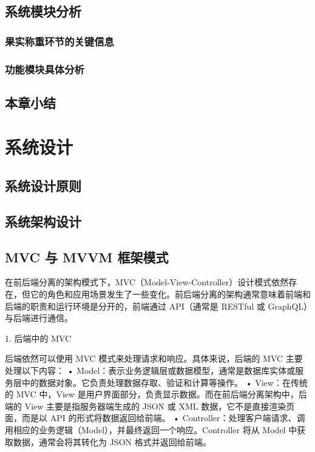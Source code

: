 \documentclass{xduugthesis}
\begin{document}
\section{系统模块分析}
\subsection{果实称重环节的关键信息}
\subsection{功能模块具体分析}

\section{本章小结}


\chapter{系统设计}

\section{系统设计原则}

\section{系统架构设计}

\section{MVC 与 MVVM 框架模式}
在前后端分离的架构模式下，MVC（Model-View-Controller）设计模式依然存在，但它的角色和应用场景发生了一些变化。前后端分离的架构通常意味着前端和后端的职责和运行环境是分开的，前端通过 API（通常是 RESTful 或 GraphQL）与后端进行通信。

1. 后端中的 MVC

后端依然可以使用 MVC 模式来处理请求和响应。具体来说，后端的 MVC 主要处理以下内容：
	•	Model：表示业务逻辑层或数据模型，通常是数据库实体或服务层中的数据对象。它负责处理数据存取、验证和计算等操作。
	•	View：在传统的 MVC 中，View 是用户界面部分，负责显示数据。而在前后端分离架构中，后端的 View 主要是指服务器端生成的 JSON 或 XML 数据，它不是直接渲染页面，而是以 API 的形式将数据返回给前端。
	•	Controller：处理客户端请求、调用相应的业务逻辑（Model），并最终返回一个响应。Controller 将从 Model 中获取数据，通常会将其转化为 JSON 格式并返回给前端。
\end{document}

